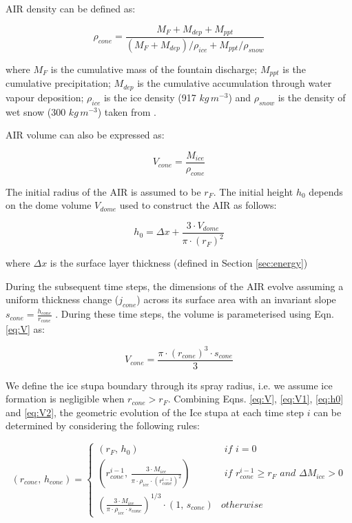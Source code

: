 AIR density can be defined as:

\begin{equation}
	\rho_{cone} = \frac{M_{F} + M_{dep} + M_{ppt}}{(M_{F} + M_{dep})/\rho_{ice} + M_{ppt}/\rho_{snow}}
\end{equation}

where $M_F$ is the cumulative mass of the fountain discharge; $M_{ppt}$ is the cumulative precipitation;
$M_{dep}$ is the cumulative accumulation through water vapour deposition; $\rho_{ice}$ is the ice density (917
$kg\,m^{-3}$) and $\rho_{snow}$ is the density of wet snow (300 $kg\,m^{-3}$) taken from
\cite{cuffeyPhysicsGlaciers2010} .

AIR volume can also be expressed as:

\begin{equation} V_{cone} =\frac{M_{ice}} {\rho_{cone}} \label{eq:V1} \end{equation}

The initial radius of the AIR is assumed to be $r_F$. The initial height $h_0$ depends on the dome volume
$V_{dome}$ used to construct the AIR as follows:

\begin{equation}
	h_{0} =  \Delta x + \frac{3 \cdot V_{dome}}{\pi \cdot (r_F)^2 }
	\label{eq:h0}
\end{equation}

where $\Delta x$ is the surface layer thickness (defined in Section \ref{sec:energy})

During the subsequent time steps, the dimensions of the AIR evolve assuming a uniform thickness change ($j_{cone}$)
across its surface area with an invariant slope $s_{cone} = \frac{h_{cone}}{r_{cone}}$ .  During these time
steps, the volume is parameterised using Eqn. \ref{eq:V} as:

\begin{equation} 
  V_{cone} = \frac{\pi \cdot {(r_{cone})}^3 \cdot s_{cone}}{3} 
\label{eq:V2} 
\end{equation}

We define the ice stupa boundary through its spray radius, i.e. we assume ice formation is negligible when $r_{cone} >
	r_{F}$. Combining Eqns. \ref{eq:V},  \ref{eq:V1}, \ref{eq:h0} and \ref{eq:V2}, the geometric evolution of the
Ice stupa at each time step $i$ can be determined by considering the following rules:

\begin{equation} (r_{cone},\, h_{cone}) = \left\{ \begin{array}{ll} (r_F ,\, h_0)                                                                          & \textit{ if } i=0 \\
             (r_{cone}^{i-1},\, \frac{3 \cdot M_{ice}}{\pi \cdot \rho_{ice} \cdot {(r_{cone}^{i-1})}^2}) & \textit{ if }
             r_{cone}^{i-1} \geq r_{F} \textit{ and } \Delta M_{ice} > 0                                                     \\ (\frac{3 \cdot M_{ice}}{\pi \cdot \rho_{ice} \cdot s_{cone}})^{1/3} \cdot (1,\,  s_{cone}) &
             otherwise\end{array} \right.  \label{eq:A2} \end{equation}


